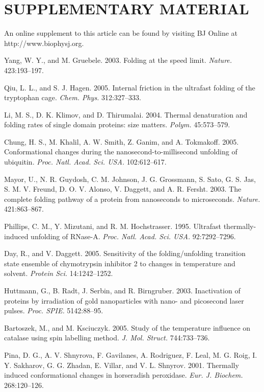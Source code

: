 \documentclass{biophys_letter}
\begin{document}
\section*{SUPPLEMENTARY MATERIAL}

An online supplement to this article can be found by visiting BJ Online at http://www.biophysj.org.\vspace*{6pt}

\begin{thebibliography}{99}
Yang, W. Y., and M. Gruebele. 2003. Folding at the speed limit. {\it Nature.} 423:193--197.

Qiu, L. L., and S. J. Hagen. 2005. Internal friction in the ultrafast folding of the tryptophan cage. {\it Chem. Phys.} 312:327--333.

Li, M. S., D. K. Klimov, and D. Thirumalai. 2004. Thermal denaturation and folding rates of single domain proteins: size matters. {\it Polym.} 45:573--579.

Chung, H. S., M. Khalil, A. W. Smith, Z. Ganim, and A. Tokmakoff. 2005. Conformational changes during the nanosecond-to-millisecond unfolding of ubiquitin. 
{\it Proc. Natl. Acad. Sci. USA.} 102:612--617.

Mayor, U., N. R. Guydosh, C. M. Johnson, J. G. Grossmann, S. Sato, G. S. Jas, S. M. V. Freund, D. O. V. Alonso, V. Daggett, and A. R. Fersht. 2003. The complete folding pathway of a protein from nanoseconds to microseconds. {\it Nature.} 421:863--867.

Phillips, C. M., Y. Mizutani, and R. M. Hochstrasser. 1995. Ultrafast thermally-induced unfolding of RNase-A. {\it Proc. Natl. Acad. Sci. USA.} 92:7292--7296.

Day, R., and V. Daggett. 2005. Sensitivity of the folding/unfolding transition state ensemble of chymotrypsin inhibitor 2 to changes in temperature and solvent. {\it Protein Sci.} 14:1242--1252.

Huttmann, G., B. Radt, J. Serbin, and R. Birngruber. 2003. Inactivation of proteins by irradiation of gold nanoparticles with nano- and picosecond laser pulses. {\it Proc. SPIE.} 5142:88--95.

Bartoszek, M., and M. Ksciuczyk. 2005. Study of the temperature influence on catalase using spin labelling method. {\it J. Mol. Struct.} 744:733--736.

Pina, D. G., A. V. Shnyrova, F. Gavilanes, A. Rodriguez, F. Leal, M. G. Roig, I. Y. Sakharov, G. G. Zhadan, E. Villar, and V. L. Shnyrov. 2001. Thermally induced conformational changes in horseradish peroxidase. {\it Eur. J. Biochem.} 268:120--126.


\end{thebibliography}
\end{document}
